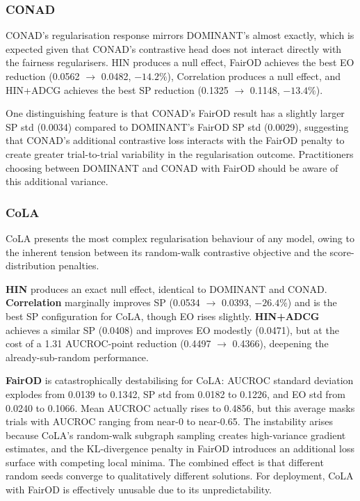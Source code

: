 \documentclass[sigconf,natbib=false]{acmart}
\begin{document}
\subsubsection{CONAD}

CONAD's regularisation response mirrors DOMINANT's almost exactly, which is expected given that CONAD's contrastive head does not interact directly with the fairness regularisers. HIN produces a null effect, FairOD achieves the best EO reduction (0.0562 $\to$ 0.0482, $-14.2\%$), Correlation produces a null effect, and HIN+ADCG achieves the best SP reduction (0.1325 $\to$ 0.1148, $-13.4\%$).

One distinguishing feature is that CONAD's FairOD result has a slightly larger SP std (0.0034) compared to DOMINANT's FairOD SP std (0.0029), suggesting that CONAD's additional contrastive loss interacts with the FairOD penalty to create greater trial-to-trial variability in the regularisation outcome. Practitioners choosing between DOMINANT and CONAD with FairOD should be aware of this additional variance.

\subsubsection{CoLA}

CoLA presents the most complex regularisation behaviour of any model, owing to the inherent tension between its random-walk contrastive objective and the score-distribution penalties.

\textbf{HIN} produces an exact null effect, identical to DOMINANT and CONAD. \textbf{Correlation} marginally improves SP (0.0534 $\to$ 0.0393, $-26.4\%$) and is the best SP configuration for CoLA, though EO rises slightly. \textbf{HIN+ADCG} achieves a similar SP (0.0408) and improves EO modestly (0.0471), but at the cost of a 1.31 AUCROC-point reduction (0.4497 $\to$ 0.4366), deepening the already-sub-random performance.

\textbf{FairOD} is catastrophically destabilising for CoLA: AUCROC standard deviation explodes from 0.0139 to 0.1342, SP std from 0.0182 to 0.1226, and EO std from 0.0240 to 0.1066. Mean AUCROC actually rises to 0.4856, but this average masks trials with AUCROC ranging from near-0 to near-0.65. The instability arises because CoLA's random-walk subgraph sampling creates high-variance gradient estimates, and the KL-divergence penalty in FairOD introduces an additional loss surface with competing local minima. The combined effect is that different random seeds converge to qualitatively different solutions. For deployment, CoLA with FairOD is effectively unusable due to its unpredictability.
\end{document}
